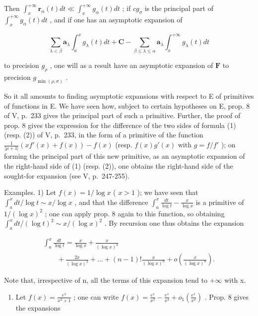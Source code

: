 Then \(\int_{x}^{+\infty}\mathbf{r}_{\alpha}(t)dt\ll \int_{x}^{+\infty}g_{\alpha}(t)dt\) ; if \(cg_{\sigma}\) is the principal part of \(\int_{x}^{+\infty}g_{\alpha}(t)dt\) , and if one has an asymptotic expansion of

\[
\sum_ {\lambda <   \beta} \mathbf {a} _ {\lambda} \int_ {a} ^ {x} g _ {\lambda} (t) d t + \mathbf {C} - \sum_ {\beta \leqslant \lambda \leqslant \alpha} \mathbf {a} _ {\lambda} \int_ {x} ^ {+ \infty} g _ {\lambda} (t) d t
\]

to precision \(g_{\rho}\) , one will as a result have an asymptotic expansion of \(\mathbf{F}\) to precision \(g_{\min(\rho, \sigma)}\) .

So it all amounts to finding asymptotic expansions with respect to E of primitives of functions in E. We have seen how, subject to certain hypotheses on E, prop. 8 of V, p.~233 gives the principal part of such a primitive. Further, the proof of prop. 8 gives the expression for the difference of the two sides of formula (1) (resp. (2)) of V, p.~233, in the form of a primitive of the function \(\frac{1}{|\mu+1|}\left(xf'(x)+f(x)\right)-f(x)\) (resp. \(f(x)g'(x)\) with \(g=f/f'\) ); on forming the principal part of this new primitive, as an asymptotic expansion of the right-hand side of (1) (resp. (2)), one obtains the right-hand side of the sought-for expansion (see V, p.~247-255).

Examples. 1) Let \(f(x) = 1 / \log x\) ( \(x > 1\) ); we have seen that \(\int_{a}^{x} dt / \log t \sim x / \log x\) , and that the difference \(\int_{a}^{x} \frac{dt}{\log t} - \frac{x}{\log x}\) is a primitive of \(1 / (\log x)^2\) ; one can apply prop. 8 again to this function, so obtaining \(\int_{a}^{x} dt / (\log t)^2 \sim x / (\log x)^2\) . By recursion one thus obtains the expansion

\[
\begin{array}{l} \int_ {a} ^ {x} \frac {d t}{\log t} = \frac {x}{\log x} + \frac {x}{(\log x) ^ {2}} \\ \qquad + \frac {2 x}{(\log x) ^ {3}} + \dots + (n - 1)! \frac {x}{(\log x) ^ {n}} + o \left(\frac {x}{(\log x) ^ {n}}\right). \end{array}
\]

Note that, irrespective of n, all the terms of this expansion tend to \(+\infty\) with x.

\begin{enumerate}
\def\labelenumi{\arabic{enumi})}
\setcounter{enumi}{1}
\tightlist
\item
  Let \(f(x) = \frac{e^x}{x^2 + 1}\) ; one can write \(f(x) = \frac{e^x}{x^2} - \frac{e^x}{x^4} + o_1\left(\frac{e^x}{x^4}\right)\) . Prop. 8 gives the expansions
\end{enumerate}

